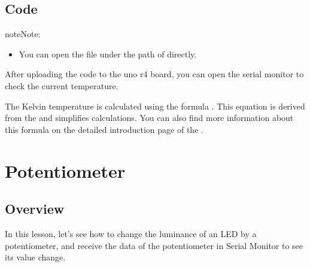 \documentclass[a4paper,11pt,english]{sphinxmanual}
\begin{document}
\subsection{Code}
\label{\detokenize{Basic_Project/Thermistor:code}}
\begin{sphinxadmonition}{note}{Note:}\begin{itemize}
\item {} 
\sphinxAtStartPar
You can open the file  under the path of  directly.

\end{itemize}
\end{sphinxadmonition}

\sphinxAtStartPar
After uploading the code to the uno r4 board, you can open the serial monitor to check the current temperature.

\sphinxAtStartPar
The Kelvin temperature is calculated using the formula . This equation is derived from the   and simplifies calculations. You can also find more information about this formula on the detailed introduction page of the {\hyperref[\detokenize{Components_Kit/component_thermistor:component-thermistor}]{}}.

\sphinxstepscope


\section{Potentiometer}
\label{\detokenize{Basic_Project/Potentiometer:potentiometer}}\label{\detokenize{Basic_Project/Potentiometer:basic-potentiometer}}\label{\detokenize{Basic_Project/Potentiometer::doc}}

\subsection{Overview}
\label{\detokenize{Basic_Project/Potentiometer:overview}}
\sphinxAtStartPar
In this lesson, let’s see how to change the luminance of an LED by a potentiometer, and receive the data of the potentiometer in Serial Monitor to see its value change.
\end{document}
